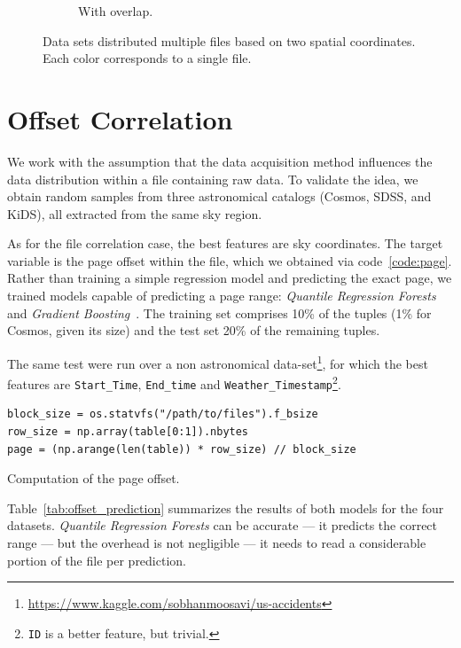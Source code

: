 \begin{figure}[htbp]
\begin{subfigure}[]{0.5\textwidth}
    \caption{With overlap.}\label{subfig:mer_multifile}
    \end{subfigure}
    \caption[Data sets distributed multiple files based on two spatial coordinates.]{
        Data sets distributed multiple files based on two spatial coordinates.
        Each color corresponds to a single file.
    }
    \label{fig:tree_cat_cut}
\end{figure}


\section{Offset Correlation}
\label{sec:offset_correlation}

We work with the assumption that the data acquisition method influences
the data distribution within a file containing raw data.
To validate the idea, we obtain random samples from three astronomical catalogs
(\gls{Cosmos}\cite{laigle2016cosmos2015}, \gls{SDSS}\cite{SDSS14}, and \gls{KiDS}\cite{de2013kilo}),
all extracted from the same sky region.

As for the file correlation case, the best features are sky coordinates.
The target variable is the page offset within the file, which we obtained via code~\ref{code:page}.
Rather than training a simple regression model and predicting the exact page, we trained models
capable of predicting a page range: \textit{Quantile Regression Forests}~\cite{meinshausen2006}
and \textit{Gradient Boosting}~\cite{mason2000}.
The training set comprises 10\% of the tuples (1\% for Cosmos, given its size) and the test
set 20\% of the remaining tuples.

The same test were run over a non astronomical data-set\footnote{\url{https://www.kaggle.com/sobhanmoosavi/us-accidents}}, for which
the best features are \texttt{Start\_Time}, \texttt{End\_time} and
\texttt{Weather\_Timestamp}\footnote{\texttt{ID} is a better feature, but trivial.}.

\begin{listing}[htpb]
\begin{verbatim}
block_size = os.statvfs("/path/to/files").f_bsize
row_size = np.array(table[0:1]).nbytes
page = (np.arange(len(table)) * row_size) // block_size
\end{verbatim}
\caption{Computation of the page offset.}
\label{code:page}
\end{listing}

Table~\ref{tab:offset_prediction} summarizes the results of both models
for the four datasets. \textit{Quantile Regression Forests} can be accurate --- it predicts
the correct range --- but the overhead is not negligible --- it needs to read
a considerable portion of the file per prediction.

